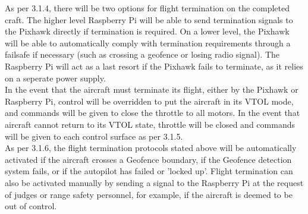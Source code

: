 As per 3.1.4, there will be two options for flight termination on the completed craft. The higher level Raspberry Pi will be able to send termination signals to the Pixhawk directly if termination is required.  On a lower level, the Pixhawk will be able to automatically comply with termination requirements through a failsafe if necessary (such as crossing a geofence or losing radio signal). The Raspberry Pi will act as a last resort if the Pixhawk fails to terminate, as it relies on a seperate power supply.\\

In the event that the aircraft must terminate its flight, either by the Pixhawk or Raspberry Pi, control will be overridden to put the aircraft in its VTOL mode, and commands will be given to close the throttle to all motors.
In the event that aircraft cannot return to its VTOL state, throttle will be closed and commands will be given to each control surface as per 3.1.5.\\

As per 3.1.6, the flight termination protocols stated above will be automatically activated if the aircraft crosses a Geofence boundary, if the Geofence detection system fails, or if the autopilot has failed or 'locked up'. Flight termination can also be activated manually by sending a signal to the Raspberry Pi at the request of judges or range safety personnel, for example, if the aircraft is deemed to be out of control.
